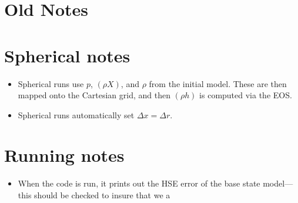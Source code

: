 \documentclass[11pt]{article}
\begin{document}
\clearpage

\section{Old Notes}
\section{Spherical notes}
\begin{itemize}
\item Spherical runs use $p$, $(\rho X)$, and $\rho$ from the initial
model.  These are then mapped onto the Cartesian grid, and then
$(\rho h)$ is computed via the EOS.
\item Spherical runs automatically set $\Delta x = \Delta r$.
\end{itemize}
\section{Running notes}
\begin{itemize}
\item When the code is run, it prints out the HSE error of the base
state model---this should be checked to insure that we a
\end{itemize}
\end{document}
